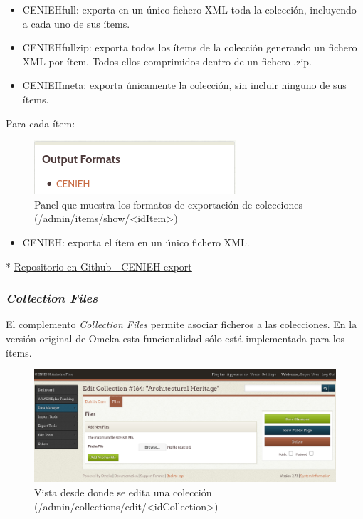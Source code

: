 \documentclass[
]{article}
\providecommand{\tightlist}{%
  \setlength{\itemsep}{0pt}\setlength{\parskip}{0pt}}
\begin{document}
\begin{itemize}
\tightlist
\item
  CENIEHfull: exporta en un único fichero XML toda la colección,
  incluyendo a cada uno de sus ítems.
\item
  CENIEHfullzip: exporta todos los ítems de la colección generando un
  fichero XML por ítem. Todos ellos comprimidos dentro de un fichero
  .zip.
\item
  CENIEHmeta: exporta únicamente la colección, sin incluir ninguno de
  sus ítems.
\end{itemize}

Para cada ítem:

\begin{figure}
\hypertarget{cenieh-export-2}{%
\centering
\includegraphics{../_static/images/cenieh-export-2.png}
\caption{Panel que muestra los formatos de exportación de colecciones
(/admin/items/show/\textless idItem\textgreater)}\label{cenieh-export-2}
}
\end{figure}

\begin{itemize}
\tightlist
\item
  CENIEH: exporta el ítem en un único fichero XML.
\end{itemize}

*
\href{https://github.com/gcm1001/TFG-CeniehAriadne/tree/master/omeka/plugins/CENIEHExport}{Repositorio
en Github - CENIEH export}

\hypertarget{collection-files}{%
\subsubsection{\texorpdfstring{\emph{Collection
Files}}{Collection Files}}\label{collection-files}}

El complemento \emph{Collection Files} permite asociar ficheros a las
colecciones. En la versión original de Omeka esta funcionalidad sólo
está implementada para los ítems.

\begin{figure}
\hypertarget{collection-files-1}{%
\centering
\includegraphics{../_static/images/collection-files-1.png}
\caption{Vista desde donde se edita una colección
(/admin/collections/edit/\textless idCollection\textgreater)}\label{collection-files-1}
}
\end{figure}
\end{document}
